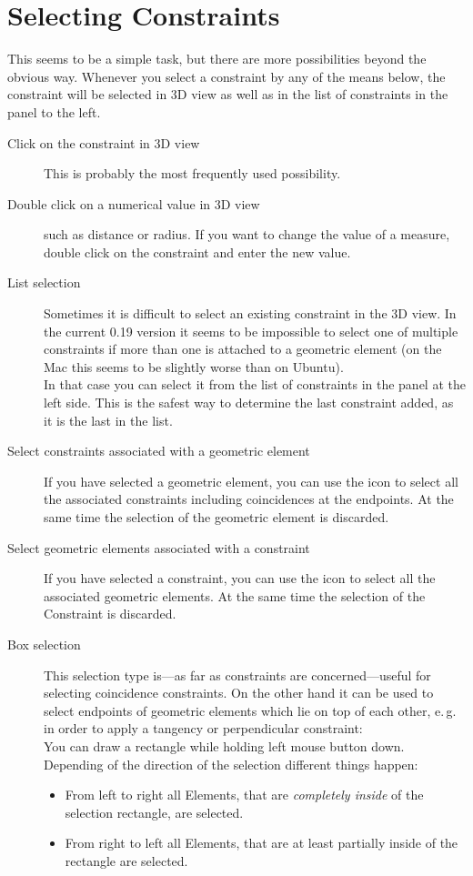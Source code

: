 \documentclass[12pt,titlepage]{article}
\newcommand{\icon}[1]{\raisebox{-1em}{\rule{0pt}{27pt}\texttt{[image: images/\#1]}}}
\begin{document}
\section{Selecting Constraints}
This seems to be a simple task, but there are more possibilities beyond the obvious
way. Whenever you select a constraint by any of the means below, the constraint will
be selected in 3D view as well as in the list of constraints in the panel to the
left.
\begin{description}
\item [Click on the constraint in 3D view] This is probably the most frequently used
      possibility.
\item [Double click on a numerical value in 3D view] such as distance or radius. If you
      want to change the value of a measure, double click on the constraint
      and enter the new value.
\item [List selection] Sometimes it is difficult to select an existing
      constraint in the 3D view. In the current 0.19 version it
      seems to be impossible to select one of multiple constraints if more
      than one is attached to a geometric element (on the Mac this seems to be
      slightly worse than on Ubuntu).\\
      In that case you can select it from the list of constraints in the panel at the
      left side. This is the safest way to determine the last constraint added, as it
      is the last in the list.
\item [Select constraints associated with a geometric element] If you have selected a
      geometric element, you can use the icon \icon{Sketcher_SelectConstraints} to
      select all the associated constraints including coincidences at the endpoints.
      At the same time the selection of the geometric element is discarded.
\item [Select geometric elements associated with a constraint] If you have selected a
      constraint, you can use the icon
      \icon{Sketcher_SelectElementsAssociatedWithConstraints} to select all the
      associated geometric elements. At the same time the selection of the
      Constraint is discarded.
\item [Box selection] This selection type is---as far as constraints are
      concerned---useful for selecting coincidence constraints. On the other hand it
      can be used to select endpoints of geometric elements which lie on top of each
      other, e.\,g. in order to apply a tangency or perpendicular constraint:\\
      You can draw a rectangle while holding left mouse button down.
      Depending of the direction of the selection different things happen:
      \begin{itemize}
      \item From left to right all Elements, that are \emph{completely inside} of the
            selection rectangle, are selected.
      \item From right to left all Elements, that are at least partially inside of
            the rectangle are selected.
      \end{itemize}
    

\end{description}
\end{document}

